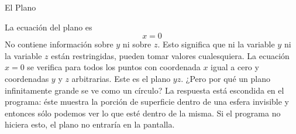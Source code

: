 \documentclass[es]{../../common/SurferDesc}%
\begin{document}
\footnotesize
%

\begin{surferPage}
  \begin{surferTitle}El Plano\end{surferTitle}
   \begin{surferText}

La ecuaci\'on del plano es \[x=0\] No contiene informaci\'on sobre $y$ ni sobre $z$. Esto significa que ni la variable $y$ ni la variable $z$ est\'an restringidas, pueden tomar valores cualesquiera. La ecuaci\'on $x=0$ se verifica para todos los puntos con coordenada $x$ igual a cero y coordenadas $y$ y $z$ arbitrarias. Este es el plano $yz$.
\newline \newline
¿Pero por qu\'e un plano infinitamente grande se ve como un c\'irculo? La respuesta est\'a escondida en el programa: \'este muestra la porci\'on de superficie dentro de una esfera invisible y entonces s\'olo podemos ver lo que est\'e dentro de la misma. Si el programa no hiciera esto, el plano no entrar\'ia en la pantalla.

     \end{surferText}
\end{surferPage}

\end{document}
